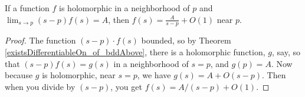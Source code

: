 \begin{theorem}[ResidueOfTendsTo]
\label{ResidueOfTendsTo}
\leanok
If a function $f$ is holomorphic in a neighborhood of $p$ and
  $\lim_{s\to p} (s-p)f(s) = A$, then
  $f(s) = \frac{A}{s-p} + O(1)$ near $p$.
\end{theorem}
\begin{proof}
\leanok
The function $(s - p)\cdot f(s)$ bounded, so by Theorem
  \ref{existsDifferentiableOn_of_bddAbove}, there is a holomorphic function, $g$, say, so that
  $(s-p)f(s) = g(s)$ in a neighborhood of $s=p$, and $g(p)=A$. Now because $g$ is holomorphic,
  near $s=p$, we have $g(s)=A+O(s-p)$. Then when you divide by $(s-p)$, you get
  $f(s) = A/(s-p) + O(1)$.
\end{proof}
